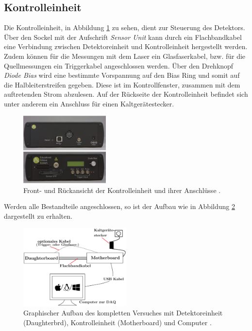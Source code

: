 \FloatBarrier
\subsection{Kontrolleinheit}
Die Kontrolleinheit, in Abbildung \ref{fig:control} zu sehen, dient zur Steuerung
des Detektors. Über den Sockel mit der Aufschrift \textit{Sensor Unit} kann durch
ein  Flachbandkabel eine Verbindung zwischen Detektoreinheit und Kontrolleinheit
hergestellt werden. Zudem können für die Messungen mit dem Laser ein Glasfaserkabel,
bzw. für die Quellmessungen ein Triggerkabel angeschlossen werden. Über den
Drehknopf \textit{Diode Bias} wird eine bestimmte Vorspannung auf den Bias Ring
und somit auf die Halbleiterstreifen gegeben. Diese ist im Kontrollfenster,
zusammen mit dem auftretenden Strom abzulesen.
Auf der Rückseite der Kontrolleinheit befindet sich unter anderem ein Anschluss
für einen Kaltgerätestecker.
\begin{figure}[htb]
  \centering
  \includegraphics[width=0.4\textwidth]{images/Control.png}
  \caption{Front- und Rückansicht der Kontrolleinheit und ihrer Anschlüsse \cite{anleitung}.}
  \label{fig:control}
\end{figure}
Werden alle Bestandteile angeschlossen, so ist der Aufbau wie in Abbildung
\ref{fig:aufbau} dargestellt zu erhalten.
\begin{figure}[htb]
  \centering
  \includegraphics[width=0.5\textwidth]{images/Aufbau.png}
  \caption{Graphischer Aufbau des kompletten Versuches mit Detektoreinheit
  (Daughterbrd), Kontrolleinheit (Motherboard) und Computer \cite{anleitung}.}
  \label{fig:aufbau}
\end{figure}

